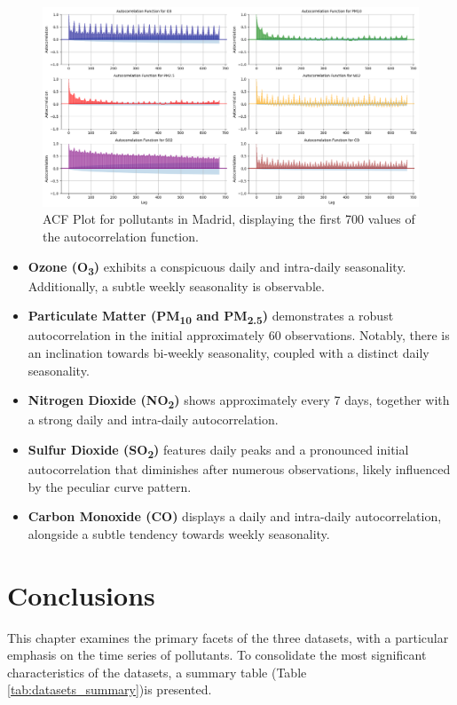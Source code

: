 \begin{figure}[h]
    \centering
    \includegraphics[width=1\linewidth]{images/acfplot_madrid.png}
    \caption{ACF Plot for pollutants in Madrid, displaying the first 700 values of the autocorrelation function.}
    \label{fig:acfplot_madrid}
\end{figure}

\begin{itemize}
    \item \textbf{Ozone (O\textsubscript{3})} exhibits a conspicuous daily and intra-daily seasonality. Additionally, a subtle weekly seasonality is observable.
    \item \textbf{Particulate Matter (PM\textsubscript{10} and PM\textsubscript{2.5})} demonstrates a robust autocorrelation in the initial approximately 60 observations. Notably, there is an inclination towards bi-weekly seasonality, coupled with a distinct daily seasonality.
    \item \textbf{Nitrogen Dioxide (NO\textsubscript{2})} shows approximately every 7 days, together with a strong daily and intra-daily autocorrelation.
    \item \textbf{Sulfur Dioxide (SO\textsubscript{2})} features daily peaks and a pronounced initial autocorrelation that diminishes after numerous observations, likely influenced by the peculiar curve pattern.
    \item \textbf{Carbon Monoxide (CO)} displays a daily and intra-daily autocorrelation, alongside a subtle tendency towards weekly seasonality.
\end{itemize}

\section{Conclusions}
This chapter examines the primary facets of the three datasets, with a particular emphasis on the time series of pollutants. To consolidate the most significant characteristics of the datasets, a summary table (Table \ref{tab:datasets_summary})is presented.



